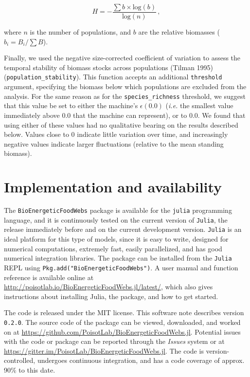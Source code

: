 \documentclass[12pt]{article}
\begin{document}
\begin{equation}
H = - \frac{\sum b \times \text{log}(b)}{\text{log}(n)}\,,
\end{equation}

where \(n\) is the number of populations, and \(b\) are the relative
biomasses (\(b_i = B_i / \sum B\)).

Finally, we used the negative size-corrected coefficient of variation to
assess the temporal stability of biomass stocks across populations
(Tilman 1995) (\texttt{population\_stability}). This function accepts an
additional \texttt{threshold} argument, specifying the biomass below
which populations are excluded from the analysis. For the same reason as
for the \texttt{species\_richness} threshold, we suggest that this value
be set to either the machine's \(\epsilon(0.0)\) (\emph{i.e.} the
smallest value immediately above 0.0 that the machine can represent), or
to \(0.0\). We found that using either of these values had no
qualitative bearing on the results described below. Values close to 0
indicate little variation over time, and increasingly negative values
indicate larger fluctuations (relative to the mean standing biomass).

\section{Implementation and
availability}\label{implementation-and-availability}

The \texttt{BioEnergeticFoodWebs} package is available for the
\texttt{julia} programming language, and it is continuously tested on
the current version of \texttt{Julia}, the release immediately before
and on the current development version. \texttt{Julia} is an ideal
platform for this type of models, since it is easy to write, designed
for numerical computations, extremely fast, easily parallelized, and has
good numerical integration libraries. The package can be installed from
the \texttt{Julia} REPL using \texttt{Pkg.add("BioEnergeticFoodWebs")}.
A user manual and function reference is available online at
\url{http://poisotlab.io/BioEnergeticFoodWebs.jl/latest/}, which also
gives instructions about installing Julia, the package, and how to get
started.

The code is released under the MIT license. This software note describes
version \texttt{0.2.0}. The source code of the package can be viewed,
downloaded, and worked on at
\url{https://github.com/PoisotLab/BioEnergeticFoodWebs.jl}. Potential
issues with the code or package can be reported through the
\emph{Issues} system or at
\url{https://gitter.im/PoisotLab/BioEnergeticFoodWebs.jl}. The code is
version-controlled, undergoes continuous integration, and has a code
coverage of approx. 90\% to this date.
\end{document}

